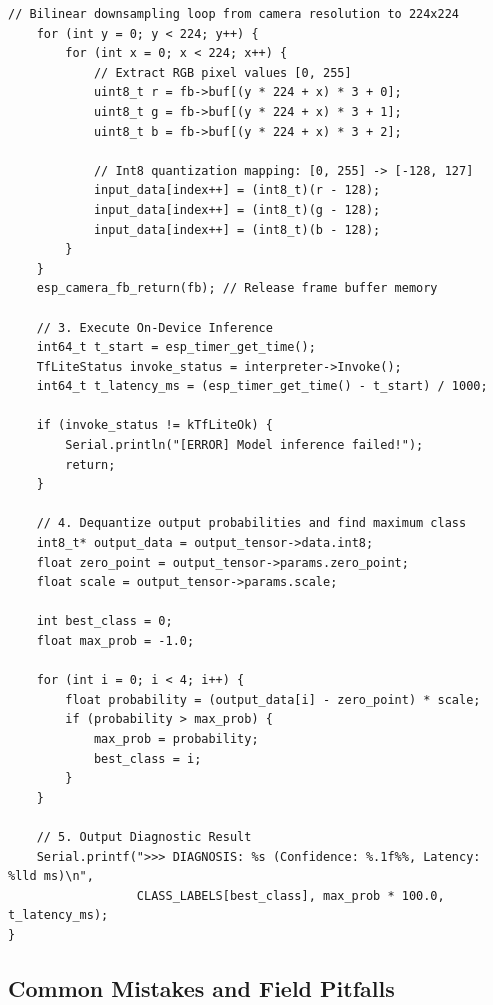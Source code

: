 \begin{lstlisting}[style=pythonstyle, caption={ESP32-CAM C++ Inference Loop with Image Preprocessing and TFLM.}, label={lst:esp32_cam_code}]
    // Bilinear downsampling loop from camera resolution to 224x224
    for (int y = 0; y < 224; y++) {
        for (int x = 0; x < 224; x++) {
            // Extract RGB pixel values [0, 255]
            uint8_t r = fb->buf[(y * 224 + x) * 3 + 0];
            uint8_t g = fb->buf[(y * 224 + x) * 3 + 1];
            uint8_t b = fb->buf[(y * 224 + x) * 3 + 2];
            
            // Int8 quantization mapping: [0, 255] -> [-128, 127]
            input_data[index++] = (int8_t)(r - 128);
            input_data[index++] = (int8_t)(g - 128);
            input_data[index++] = (int8_t)(b - 128);
        }
    }
    esp_camera_fb_return(fb); // Release frame buffer memory
    
    // 3. Execute On-Device Inference
    int64_t t_start = esp_timer_get_time();
    TfLiteStatus invoke_status = interpreter->Invoke();
    int64_t t_latency_ms = (esp_timer_get_time() - t_start) / 1000;
    
    if (invoke_status != kTfLiteOk) {
        Serial.println("[ERROR] Model inference failed!");
        return;
    }
    
    // 4. Dequantize output probabilities and find maximum class
    int8_t* output_data = output_tensor->data.int8;
    float zero_point = output_tensor->params.zero_point;
    float scale = output_tensor->params.scale;
    
    int best_class = 0;
    float max_prob = -1.0;
    
    for (int i = 0; i < 4; i++) {
        float probability = (output_data[i] - zero_point) * scale;
        if (probability > max_prob) {
            max_prob = probability;
            best_class = i;
        }
    }
    
    // 5. Output Diagnostic Result
    Serial.printf(">>> DIAGNOSIS: %s (Confidence: %.1f%%, Latency: %lld ms)\n",
                  CLASS_LABELS[best_class], max_prob * 100.0, t_latency_ms);
}
\end{lstlisting}

\subsection{Common Mistakes and Field Pitfalls}\label{subsec:p2_pitfalls}

